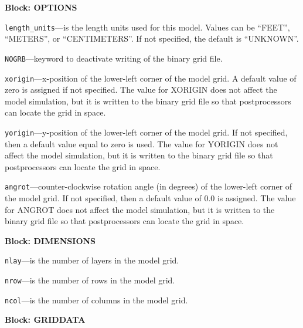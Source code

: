 
\item \textbf{Block: OPTIONS}

\begin{description}
\item \texttt{length\_units}---is the length units used for this model.  Values can be ``FEET'', ``METERS'', or ``CENTIMETERS''.  If not specified, the default is ``UNKNOWN''.

\item \texttt{NOGRB}---keyword to deactivate writing of the binary grid file.

\item \texttt{xorigin}---x-position of the lower-left corner of the model grid.  A default value of zero is assigned if not specified.  The value for XORIGIN does not affect the model simulation, but it is written to the binary grid file so that postprocessors can locate the grid in space.

\item \texttt{yorigin}---y-position of the lower-left corner of the model grid.  If not specified, then a default value equal to zero is used.  The value for YORIGIN does not affect the model simulation, but it is written to the binary grid file so that postprocessors can locate the grid in space.

\item \texttt{angrot}---counter-clockwise rotation angle (in degrees) of the lower-left corner of the model grid.  If not specified, then a default value of 0.0 is assigned.  The value for ANGROT does not affect the model simulation, but it is written to the binary grid file so that postprocessors can locate the grid in space.

\end{description}
\item \textbf{Block: DIMENSIONS}

\begin{description}
\item \texttt{nlay}---is the number of layers in the model grid.

\item \texttt{nrow}---is the number of rows in the model grid.

\item \texttt{ncol}---is the number of columns in the model grid.

\end{description}
\item \textbf{Block: GRIDDATA}

